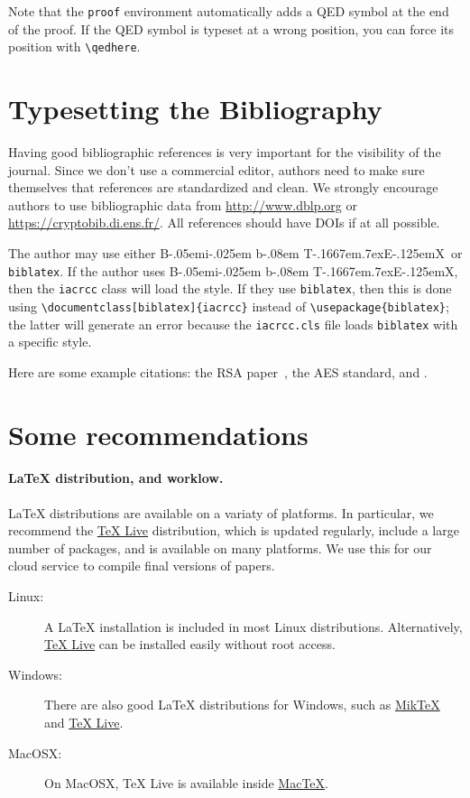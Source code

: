 \documentclass{iacrcc}
\begin{document}
Note that the \texttt{proof} environment automatically adds a QED
symbol at the end of the proof.
If the QED symbol
is typeset at a wrong position, you can force its position with
\verb+\qedhere+.

\section{Typesetting the Bibliography}
\label{sec:biblio}

\def\BibTeX{{\rm B\kern-.05em{\sc i\kern-.025em b}\kern-.08em
    T\kern-.1667em\lower.7ex\hbox{E}\kern-.125emX}}

Having good bibliographic references is very important for the
visibility of the journal.  Since we don't use a commercial editor,
authors need to make sure themselves that references are standardized
and clean.  We strongly encourage authors to use bibliographic data
from \url{http://www.dblp.org} or \url{https://cryptobib.di.ens.fr/}.
All references should have DOIs if at all possible.

The author may use either \BibTeX\ or \texttt{biblatex}. If the author
uses \BibTeX, then the \texttt{iacrcc} class will load the
\verb++ style.  If they use
\texttt{biblatex}, then this is done using
\verb+\documentclass[biblatex]{iacrcc}+ instead of
\verb+\usepackage{biblatex}+; the latter will generate an error
because the \texttt{iacrcc.cls} file loads \texttt{biblatex} with a
specific style.

Here are some example citations: the RSA paper~\cite{RSA78}, the AES
standard\cite{AES-FIPS}, and \cite{DBLP:conf/crypto/Kocher96}.

\section{Some recommendations}\label{sec:options}

\paragraph{\LaTeX{} distribution, and worklow.}  \LaTeX{}
distributions are available on a variaty of platforms.  In particular,
we recommend the \href{https://www.tug.org/texlive/}{TeX Live}
distribution, which is updated regularly, include a large number of
packages, and is available on many platforms. We use this for our
cloud service to compile final versions of papers.
\begin{description}
\item[Linux:] A LaTeX installation is included in most Linux
  distributions.  Alternatively,
  \href{https://www.tug.org/texlive/}{TeX Live} can be installed
  easily without root access.
\item[Windows:] There are also good \LaTeX{} distributions for Windows,
  such as \href{http://www.miktex.org/}{MikTeX} and
  \href{https://www.tug.org/texlive/}{TeX Live}.
\item[MacOSX:] On MacOSX, TeX Live is available inside
  \href{http://www.tug.org/mactex/}{MacTeX}.
\end{description}
\end{document}
